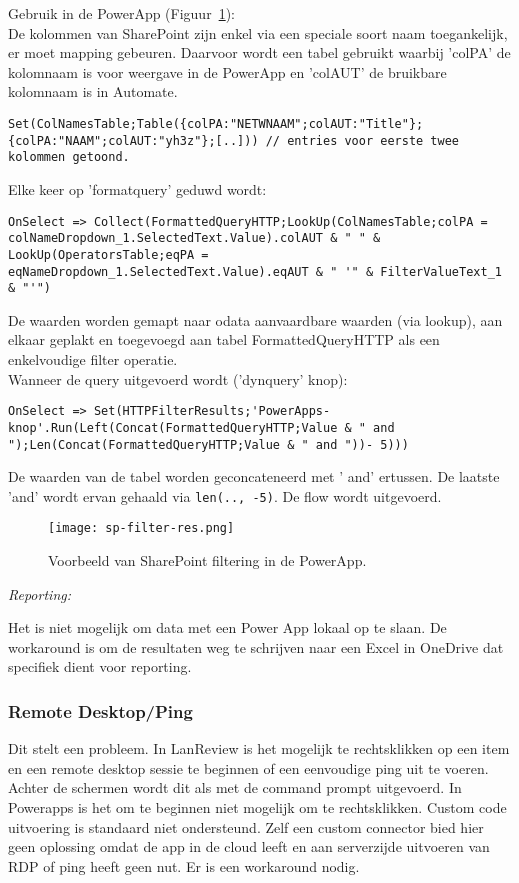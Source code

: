 Gebruik in de PowerApp (Figuur~\ref{fig:sp-filter-res}):\\
De kolommen van SharePoint zijn enkel via een speciale soort naam toegankelijk, er moet mapping gebeuren. Daarvoor wordt een tabel gebruikt waarbij 'colPA' de kolomnaam is voor weergave in de PowerApp en 'colAUT' de bruikbare kolomnaam is in Automate.
\begin{lstlisting}
Set(ColNamesTable;Table({colPA:"NETWNAAM";colAUT:"Title"};{colPA:"NAAM";colAUT:"yh3z"};[..])) // entries voor eerste twee kolommen getoond.
\end{lstlisting}
Elke keer op 'formatquery' geduwd wordt:
\begin{lstlisting}
OnSelect => Collect(FormattedQueryHTTP;LookUp(ColNamesTable;colPA = colNameDropdown_1.SelectedText.Value).colAUT & " " & LookUp(OperatorsTable;eqPA = eqNameDropdown_1.SelectedText.Value).eqAUT & " '" & FilterValueText_1 & "'")
\end{lstlisting}
De waarden worden gemapt naar odata aanvaardbare waarden (via lookup), aan elkaar geplakt en toegevoegd aan tabel FormattedQueryHTTP als een enkelvoudige filter operatie.\\
Wanneer de query uitgevoerd wordt ('dynquery' knop):
\begin{lstlisting}
OnSelect => Set(HTTPFilterResults;'PowerApps-knop'.Run(Left(Concat(FormattedQueryHTTP;Value & " and ");Len(Concat(FormattedQueryHTTP;Value & " and "))- 5)))
\end{lstlisting}
De waarden van de tabel worden geconcateneerd met ' and' ertussen. De laatste 'and' wordt ervan gehaald via \lstinline|len(.., -5)|. De flow wordt uitgevoerd.

\begin{figure}[h!]
    \centering
    \texttt{[image: sp-filter-res.png]}
    \caption{Voorbeeld van SharePoint filtering in de PowerApp.}
    \label{fig:sp-filter-res}
\end{figure}

\textit{Reporting:}

Het is niet mogelijk om data met een Power App lokaal op te slaan. De workaround is om de resultaten weg te schrijven naar een Excel in OneDrive dat specifiek dient voor reporting.

\subsubsection{Remote Desktop/Ping}
\label{subsec:rdp-ping}

Dit stelt een probleem. In LanReview is het mogelijk te rechtsklikken op een item en een remote desktop sessie te beginnen of een eenvoudige ping uit te voeren. Achter de schermen wordt dit als met de command prompt uitgevoerd. In Powerapps is het om te beginnen niet mogelijk om te rechtsklikken. Custom code uitvoering is standaard niet ondersteund. Zelf een custom connector bied hier geen oplossing omdat de app in de cloud leeft en aan serverzijde uitvoeren van RDP of ping heeft geen nut. Er is een workaround nodig.

